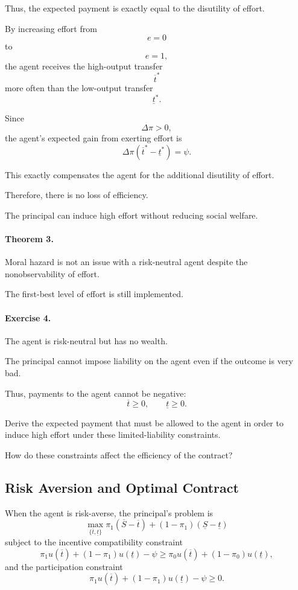 Thus, the expected payment is exactly equal to the disutility of effort.

By increasing effort from
\[
e=0
\]
to
\[
e=1,
\]
the agent receives the high-output transfer
\[
\overline t^*
\]
more often than the low-output transfer
\[
\underline t^*.
\]

Since
\[
\Delta\pi>0,
\]
the agent's expected gain from exerting effort is
\[
\Delta\pi(\overline t^*-\underline t^*)
=
\psi.
\]

This exactly compensates the agent for the additional disutility of effort.

Therefore, there is no loss of efficiency.

The principal can induce high effort without reducing social welfare.

\paragraph{Theorem 3.}

Moral hazard is not an issue with a risk-neutral agent despite the nonobservability of effort.

The first-best level of effort is still implemented.



\paragraph{Exercise 4.}

The agent is risk-neutral but has no wealth.

The principal cannot impose liability on the agent even if the outcome is very bad.

Thus, payments to the agent cannot be negative:
\[
\overline t\ge 0,
\qquad
\underline t\ge 0.
\]

Derive the expected payment that must be allowed to the agent in order to induce high effort under these limited-liability constraints.

How do these constraints affect the efficiency of the contract?

\subsection{Risk Aversion and Optimal Contract}

When the agent is risk-averse, the principal's problem is
\[
\max_{\{\overline t,\underline t\}}
\pi_1(\overline S-\overline t)
+
(1-\pi_1)(\underline S-\underline t)
\]
subject to the incentive compatibility constraint
\[
\pi_1u(\overline t)
+
(1-\pi_1)u(\underline t)
-
\psi
\ge
\pi_0u(\overline t)
+
(1-\pi_0)u(\underline t),
\]
and the participation constraint
\[
\pi_1u(\overline t)
+
(1-\pi_1)u(\underline t)
-
\psi
\ge 0.
\]

